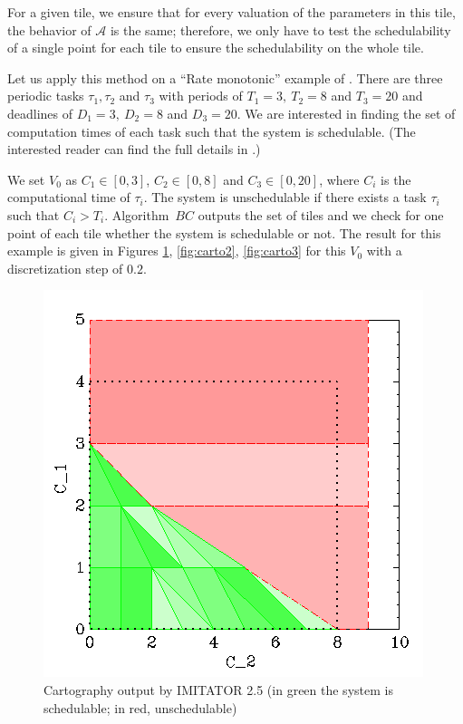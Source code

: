 \documentclass{article}
\newcommand{\A}{\mathcal{A}}
\newcommand{\IM}{\mathit{IM}}
\newcommand{\BC}{\mathit{BC}}
\begin{document}
For a given tile, we ensure that for every valuation of the parameters in this tile, the behavior of $\mathcal{A}$ is the same;
therefore, we only have to test the schedulability of a single point for each tile to ensure the schedulability on the whole tile.

Let us apply this method on a ``Rate monotonic'' example of \cite[Section~III]{bb04}.
There are three periodic tasks $\tau_1, \tau_2$ and $\tau_3$ with periods of $T_1 = 3, \ T_2 = 8$ and $T_3 = 20$ and deadlines of $D_1 = 3, \ D_2 = 8$ and $D_3 = 20$.
We are interested in finding the set of computation times of each task such that the system is schedulable.
(The interested reader can find the full details in \cite{bb04}.)

We set $V_0$ as $C_1 \in [0,3]$, $C_2 \in [0,8]$ and $C_3 \in [0,20]$, where $C_i$ is the computational time of $\tau_i$. The system is unschedulable if there exists a task $\tau_i$ such that $C_i > T_i$. 
Algorithm~$BC$ outputs the set of tiles and we check for one point of each tile whether the system is schedulable or not.
The result for this example is given in Figures \ref{fig:carto1}, \ref{fig:carto2}, \ref{fig:carto3} for this $V_0$ with a discretization step of $0.2$.

\begin{figure}[!ht]
	\centering
 	\includegraphics[scale = 0.5]{./Figures/C1-C2.png}
	\caption{Cartography output by IMITATOR 2.5 (in green the system is schedulable; in red, unschedulable)}
	\label{fig:carto1}
\end{figure}
\end{document}

